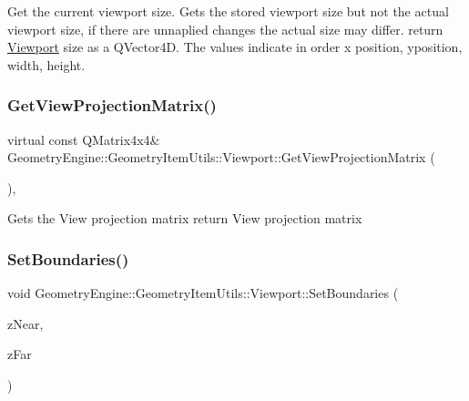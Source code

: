 Get the current viewport size. Gets the stored viewport size but not the actual viewport size, if there are unnaplied changes the actual size may differ. return \mbox{\hyperlink{class_geometry_engine_1_1_geometry_item_utils_1_1_viewport}{Viewport}} size as a Q\+Vector4D. The values indicate in order x position, yposition, width, height. \mbox{\label{class_geometry_engine_1_1_geometry_item_utils_1_1_viewport_a026573276a6c7523adf0a2024597da46}} 
\subsubsection{\texorpdfstring{GetViewProjectionMatrix()}{GetViewProjectionMatrix()}}
{\footnotesize\ttfamily virtual const Q\+Matrix4x4\& Geometry\+Engine\+::\+Geometry\+Item\+Utils\+::\+Viewport\+::\+Get\+View\+Projection\+Matrix (\begin{DoxyParamCaption}{ }\end{DoxyParamCaption})\hspace{0.3cm}{\ttfamily [inline]}, {\ttfamily [virtual]}}

Gets the View projection matrix return View projection matrix \mbox{\label{class_geometry_engine_1_1_geometry_item_utils_1_1_viewport_a9500d8b22395ee3f94611881ea89b0aa}} 
\subsubsection{\texorpdfstring{SetBoundaries()}{SetBoundaries()}}
{\footnotesize\ttfamily void Geometry\+Engine\+::\+Geometry\+Item\+Utils\+::\+Viewport\+::\+Set\+Boundaries (\begin{DoxyParamCaption}\item[{G\+Ldouble}]{z\+Near,  }\item[{G\+Ldouble}]{z\+Far }\end{DoxyParamCaption})\hspace{0.3cm}{\ttfamily [inline]}}


